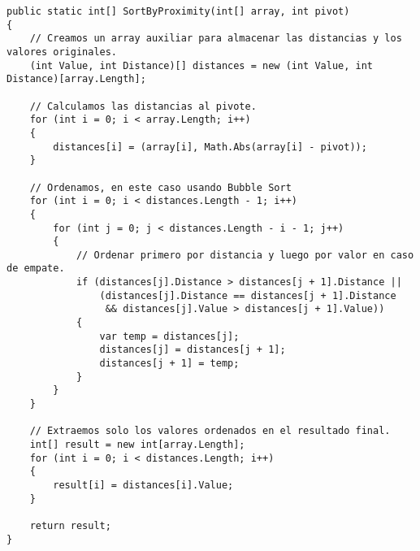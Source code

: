 \begin{lstlisting}
public static int[] SortByProximity(int[] array, int pivot)
{
    // Creamos un array auxiliar para almacenar las distancias y los valores originales.
    (int Value, int Distance)[] distances = new (int Value, int Distance)[array.Length];
    
    // Calculamos las distancias al pivote.
    for (int i = 0; i < array.Length; i++)
    {
        distances[i] = (array[i], Math.Abs(array[i] - pivot));
    }

    // Ordenamos, en este caso usando Bubble Sort
    for (int i = 0; i < distances.Length - 1; i++)
    {
        for (int j = 0; j < distances.Length - i - 1; j++)
        {
            // Ordenar primero por distancia y luego por valor en caso de empate.
            if (distances[j].Distance > distances[j + 1].Distance ||
                (distances[j].Distance == distances[j + 1].Distance 
                 && distances[j].Value > distances[j + 1].Value))
            {
                var temp = distances[j];
                distances[j] = distances[j + 1];
                distances[j + 1] = temp;
            }
        }
    }

    // Extraemos solo los valores ordenados en el resultado final.
    int[] result = new int[array.Length];
    for (int i = 0; i < distances.Length; i++)
    {
        result[i] = distances[i].Value;
    }

    return result;
}
\end{lstlisting}